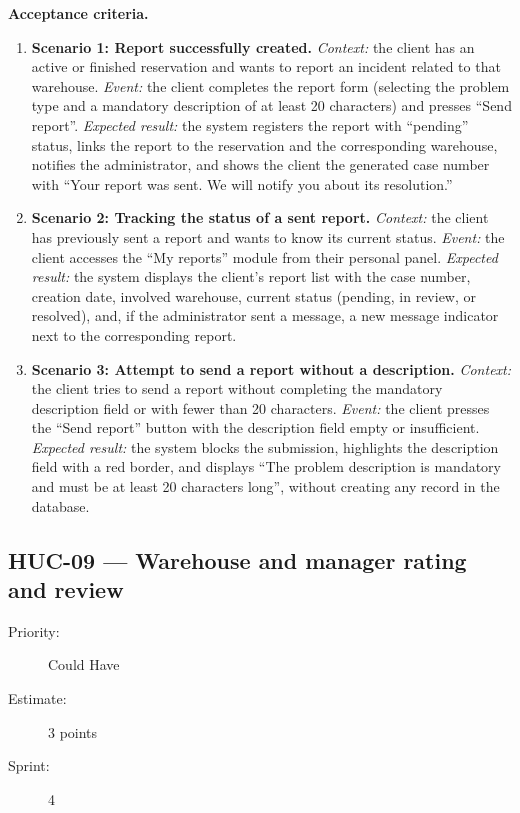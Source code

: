 \documentclass[11pt,a4paper,oneside]{report}
\begin{document}
\textbf{Acceptance criteria.}
\begin{enumerate}
\item \textbf{Scenario 1: Report successfully created.} \emph{Context:} the client has an active or finished reservation and wants to report an incident related to that warehouse. \emph{Event:} the client completes the report form (selecting the problem type and a mandatory description of at least 20 characters) and presses ``Send report''. \emph{Expected result:} the system registers the report with ``pending'' status, links the report to the reservation and the corresponding warehouse, notifies the administrator, and shows the client the generated case number with ``Your report was sent. We will notify you about its resolution.''
\item \textbf{Scenario 2: Tracking the status of a sent report.} \emph{Context:} the client has previously sent a report and wants to know its current status. \emph{Event:} the client accesses the ``My reports'' module from their personal panel. \emph{Expected result:} the system displays the client's report list with the case number, creation date, involved warehouse, current status (pending, in review, or resolved), and, if the administrator sent a message, a new message indicator next to the corresponding report.
\item \textbf{Scenario 3: Attempt to send a report without a description.} \emph{Context:} the client tries to send a report without completing the mandatory description field or with fewer than 20 characters. \emph{Event:} the client presses the ``Send report'' button with the description field empty or insufficient. \emph{Expected result:} the system blocks the submission, highlights the description field with a red border, and displays ``The problem description is mandatory and must be at least 20 characters long'', without creating any record in the database.
\end{enumerate}

\subsection{HUC-09 --- Warehouse and manager rating and review}
\label{req:HUC-09}
\begin{description}
\item[Priority:] Could Have \quad \item[Estimate:] 3 points \quad \item[Sprint:] 4
\end{description}
\end{document}
